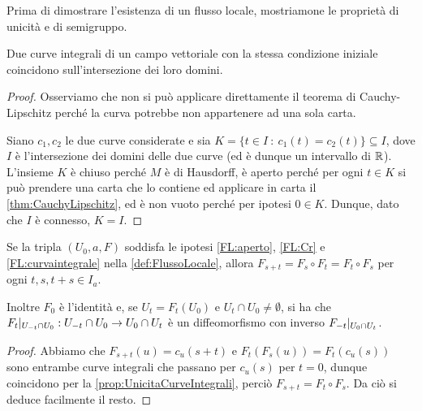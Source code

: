 Prima di dimostrare l'esistenza di un flusso locale, mostriamone le proprietà di unicità e di semigruppo.
 
\begin{proposition} \label{prop:UnicitaCurveIntegrali}
	Due curve integrali di un campo vettoriale con la stessa condizione iniziale coincidono sull'intersezione dei loro domini.
\end{proposition}

\begin{proof}
	Osserviamo che non si può applicare direttamente il teorema di Cauchy-Lipschitz perché la curva potrebbe non appartenere ad una sola carta.
	
	Siano $c_1,c_2$ le due curve considerate e sia $K=\{ t\in I\ : \ c_1(t)=c_2(t)\}\subseteq I$, dove $I$ è l'intersezione dei domini delle due curve (ed è dunque un intervallo di $\mathbb R$). L'insieme $K$ è chiuso perché $M$ è di Hausdorff, è aperto perché per ogni $t\in K$ si può prendere una carta che lo contiene ed applicare in carta il \cref{thm:CauchyLipschitz}, ed è non vuoto perché per ipotesi $0\in K$. Dunque, dato che $I$ è connesso, $K=I$.
\end{proof}

\begin{proposition}
	Se la tripla $(U_0,a,F)$ soddisfa le ipotesi \ref{FL:aperto}, \ref{FL:Cr} e \ref{FL:curvaintegrale} nella \cref{def:FlussoLocale}, allora $F_{s+t}=F_s\circ F_t=F_t\circ F_s$ per ogni $t,s,t+s\in I_a$.
	
	Inoltre $F_0$ è l'identità e, se $U_t=F_t(U_0)$ e $U_t\cap U_0\ne\emptyset$, si ha che $F_t|_{U_{-t}\cap U_0}:U_{-t}\cap U_0\to U_0\cap U_t$ è un diffeomorfismo con inverso $F_{-t}|_{U_0\cap U_t}$.
\end{proposition}

\begin{proof}
	Abbiamo che $F_{s+t}(u)=c_u(s+t)$ e $F_t(F_s(u))=F_t(c_u(s))$ sono entrambe curve integrali che passano per $c_u(s)$ per $t=0$, dunque coincidono per la \cref{prop:UnicitaCurveIntegrali}, perciò $F_{s+t}=F_t\circ F_s$. Da ciò si deduce facilmente il resto.
\end{proof}


